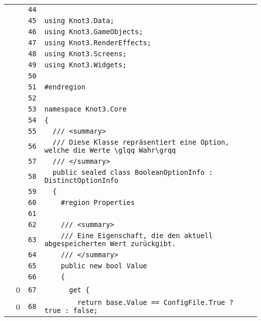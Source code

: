 \documentclass[a4paper,10pt]{article}
\begin{document}
\begin{longtable}[l]{lrrl}
\cellcolor{gray} &  & \verb~44~ & \verb~~\\
\cellcolor{gray} &  & \verb~45~ & \verb~using Knot3.Data;~\\
\cellcolor{gray} &  & \verb~46~ & \verb~using Knot3.GameObjects;~\\
\cellcolor{gray} &  & \verb~47~ & \verb~using Knot3.RenderEffects;~\\
\cellcolor{gray} &  & \verb~48~ & \verb~using Knot3.Screens;~\\
\cellcolor{gray} &  & \verb~49~ & \verb~using Knot3.Widgets;~\\
\cellcolor{gray} &  & \verb~50~ & \verb~~\\
\cellcolor{gray} &  & \verb~51~ & \verb~#endregion~\\
\cellcolor{gray} &  & \verb~52~ & \verb~~\\
\cellcolor{gray} &  & \verb~53~ & \verb~namespace Knot3.Core~\\
\cellcolor{gray} &  & \verb~54~ & \verb~{~\\
\cellcolor{gray} &  & \verb~55~ & \verb~  /// <summary>~\\
\cellcolor{gray} &  & \verb~56~ & \verb~  /// Diese Klasse repräsentiert eine Option, welche die Werte \glqq Wahr\grqq~\\
\cellcolor{gray} &  & \verb~57~ & \verb~  /// </summary>~\\
\cellcolor{gray} &  & \verb~58~ & \verb~  public sealed class BooleanOptionInfo : DistinctOptionInfo~\\
\cellcolor{gray} &  & \verb~59~ & \verb~  {~\\
\cellcolor{gray} &  & \verb~60~ & \verb~    #region Properties~\\
\cellcolor{gray} &  & \verb~61~ & \verb~~\\
\cellcolor{gray} &  & \verb~62~ & \verb~    /// <summary>~\\
\cellcolor{gray} &  & \verb~63~ & \verb~    /// Eine Eigenschaft, die den aktuell abgespeicherten Wert zurückgibt.~\\
\cellcolor{gray} &  & \verb~64~ & \verb~    /// </summary>~\\
\cellcolor{gray} &  & \verb~65~ & \verb~    public new bool Value~\\
\cellcolor{gray} &  & \verb~66~ & \verb~    {~\\
\cellcolor{red} & 0 & \verb~67~ & \verb~      get {~\\
\cellcolor{red} & 0 & \verb~68~ & \verb~        return base.Value == ConfigFile.True ? true : false;~\\

\end{longtable}
\end{document}
